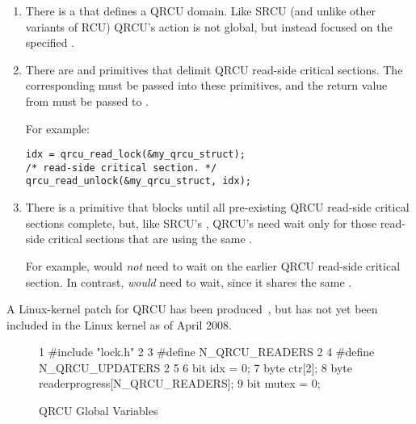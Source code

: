 \begin{enumerate}
\item	There is a  that defines a QRCU domain.
	Like SRCU (and unlike other variants of RCU) QRCU's action
	is not global, but instead focused on the specified
	.
\item	There are  and 
	primitives that delimit QRCU read-side critical sections.
	The corresponding  must be passed into
	these primitives, and the return value from 
	must be passed to .

	For example:

\vspace{5pt}
\begin{minipage}[t]{\columnwidth}
\scriptsize
\begin{verbatim}
idx = qrcu_read_lock(&my_qrcu_struct);
/* read-side critical section. */
qrcu_read_unlock(&my_qrcu_struct, idx);
\end{verbatim}
\end{minipage}
\vspace{5pt}

\item	There is a  primitive that blocks until
	all pre-existing QRCU read-side critical sections complete,
	but, like SRCU's , QRCU's
	 need wait only for those read-side
	critical sections that are using the same .

	For example, 
	would \emph{not} need to wait on the earlier QRCU read-side
	critical section.
	In contrast, 
	\emph{would} need to wait, since it shares the same
	.
\end{enumerate}

A Linux-kernel patch for QRCU has been
produced~\cite{PaulMcKenney2007QRCUpatch},
but has not yet been included in the Linux kernel as of
April 2008.

\begin{figure}[htbp]
{ \scriptsize
\begin{verbbox}
  1 #include "lock.h"
  2
  3 #define N_QRCU_READERS 2
  4 #define N_QRCU_UPDATERS 2
  5
  6 bit idx = 0;
  7 byte ctr[2];
  8 byte readerprogress[N_QRCU_READERS];
  9 bit mutex = 0;
\end{verbbox}
}
\centering
\theverbbox
\caption{QRCU Global Variables}
\label{fig:analysis:QRCU Global Variables}
\end{figure}

